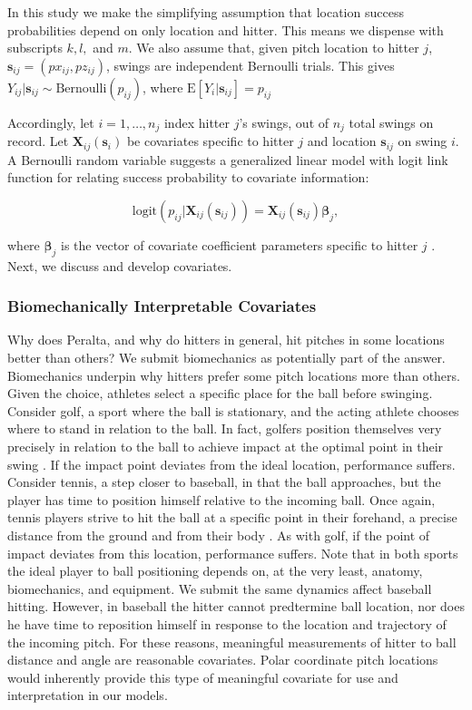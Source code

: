 \documentclass{article}
\begin{document}
In this study we make the simplifying assumption that location success probabilities depend on only location and hitter. This means we dispense with subscripts $k, l,$ and $m$. We also assume that, given pitch location to hitter $j$, $\pmb{s}_{ij} = (px_{ij}, pz_{ij})$,  swings are independent Bernoulli trials. This gives $Y_{ij}|\pmb{s}_{ij} \sim \text{Bernoulli}(p_{ij})$, where $\text{E}[Y_{i}|\pmb{s}_{ij}] = p_{ij}$

Accordingly, let $i = 1, \dots, n_{j}$ index hitter $j$'s swings, out of $n_{j}$ total swings on record. Let $\pmb{X}_{ij}(\pmb{s}_{i})$ be covariates specific to hitter $j$ and location $\pmb{s}_{ij}$ on swing $i$. A Bernoulli random variable suggests a generalized linear model with logit link function for relating success probability to covariate information: 

\begin{equation}
\text{logit}(p_{ij}|\pmb{X}_{ij}(\pmb{s}_{ij})) = \pmb{X}_{ij}(\pmb{s}_{ij}) \pmb{\beta}_{j},
\end{equation}

where $\pmb{\beta}_{j}$ is the vector of covariate coefficient parameters specific to hitter $j$ \citep{Myers2012}. Next, we discuss and develop covariates.

\subsubsection{Biomechanically Interpretable Covariates} %

Why does Peralta, and why do hitters in general, hit pitches in some locations better than others? We submit biomechanics as potentially part of the answer. Biomechanics underpin why hitters prefer some pitch locations more than others. Given the choice, athletes select a specific place for the ball before swinging. Consider golf, a sport where the ball is stationary, and the acting athlete chooses where to stand in relation to the ball. In fact, golfers position themselves very precisely in relation to the ball to achieve impact at the optimal point in their swing \citep{Cochran2005}. If the impact point deviates from the ideal location, performance suffers. Consider tennis, a step closer to baseball, in that the ball approaches, but the player has time to position himself relative to the incoming ball. Once again, tennis players strive to hit the ball at a specific point in their forehand, a precise distance from the ground and from their body \citep{Elliott2006}. As with golf, if the point of impact deviates from this location, performance suffers. Note that in both sports the ideal player to ball positioning depends on, at the very least, anatomy, biomechanics, and equipment. We submit the same dynamics affect baseball hitting. However, in baseball the hitter cannot predtermine ball location, nor does he have time to reposition himself in response to the location and trajectory of the incoming pitch. For these reasons, meaningful measurements of hitter to ball distance and angle are reasonable covariates. Polar coordinate pitch locations would inherently provide this type of meaningful covariate for use and interpretation in our models. 
\end{document}
